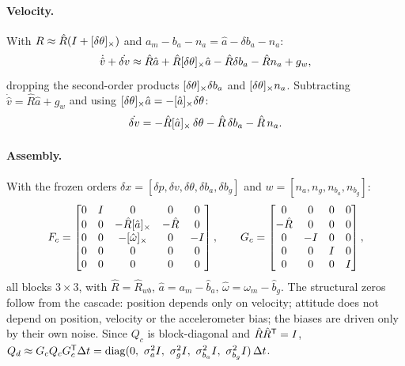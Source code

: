 \paragraph{Velocity.} With $R \approx \hat R(I + [\delta\theta]_{\times})$ and $a_m - b_a - n_a = \hat a - \delta b_a - n_a$:
\begin{equation*}
  \dot{\hat v} + \dot{\delta v} \approx \hat R\hat a + \hat R[\delta\theta]_{\times}\hat a - \hat R\delta b_a - \hat Rn_a + g_w,
\end{equation*}
dropping the second-order products $[\delta\theta]_{\times}\delta b_a$ and $[\delta\theta]_{\times}n_a$. Subtracting $\dot{\hat v} = \hat R\hat a + g_w$ and using
$[\delta\theta]_{\times}\hat a = -[\hat a]_{\times}\delta\theta$:
\begin{equation}
  \dot{\delta v} = -\hat R[\hat a]_{\times}\,\delta\theta - \hat R\,\delta b_a - \hat R\,n_a .
\end{equation}

\paragraph{Assembly.} With the frozen orders $\delta x = [\delta p, \delta v, \delta\theta, \delta b_a, \delta b_g]$ and $w = [n_a, n_g, n_{b_a}, n_{b_g}]$:
\begin{equation}
  F_c = \begin{bmatrix}
    0 & I & 0 & 0 & 0 \\
    0 & 0 & -\hat R[\hat a]_{\times} & -\hat R & 0 \\
    0 & 0 & -[\hat\omega]_{\times} & 0 & -I \\
    0 & 0 & 0 & 0 & 0 \\
    0 & 0 & 0 & 0 & 0
  \end{bmatrix}, \qquad
  G_c = \begin{bmatrix}
    0 & 0 & 0 & 0 \\
    -\hat R & 0 & 0 & 0 \\
    0 & -I & 0 & 0 \\
    0 & 0 & I & 0 \\
    0 & 0 & 0 & I
  \end{bmatrix},
\end{equation}
all blocks $3\times3$, with $\hat R = \hat R_{wb}$, $\hat a = a_m - \hat b_a$, $\hat\omega = \omega_m - \hat b_g$. The structural zeros follow from the cascade: position
depends only on velocity; attitude does not depend on position, velocity or the accelerometer bias; the biases are driven only by
their own noise. Since $Q_c$ is block-diagonal and $\hat R\hat R^{\mathsf{T}} = I$,
$Q_d \approx G_cQ_cG_c\T\Dt = \diag(0,\ \sigma_a^2I,\ \sigma_g^2I,\ \sigma_{b_a}^2I,\ \sigma_{b_g}^2I)\,\Dt$.

